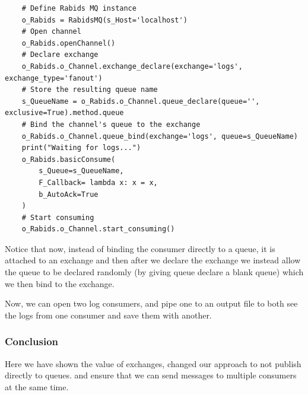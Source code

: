 \documentclass{article}
\begin{document}
\begin{verbatim}
    # Define Rabids MQ instance
    o_Rabids = RabidsMQ(s_Host='localhost')
    # Open channel 
    o_Rabids.openChannel()
    # Declare exchange
    o_Rabids.o_Channel.exchange_declare(exchange='logs', exchange_type='fanout')
    # Store the resulting queue name
    s_QueueName = o_Rabids.o_Channel.queue_declare(queue='', exclusive=True).method.queue
    # Bind the channel's queue to the exchange
    o_Rabids.o_Channel.queue_bind(exchange='logs', queue=s_QueueName)
    print("Waiting for logs...")
    o_Rabids.basicConsume(
        s_Queue=s_QueueName,
        F_Callback= lambda x: x = x,
        b_AutoAck=True
    )
    # Start consuming
    o_Rabids.o_Channel.start_consuming()
\end{verbatim}

Notice that now, instead of binding the consumer directly to a queue, it is attached to an exchange and then after we declare the exchange we instead allow the queue to be declared randomly (by giving queue declare a blank queue) which we then bind to the exchange.

Now, we can open two log consumers, and pipe one to an output file to both see the logs from one consumer and save them with another.

\subsubsection{Conclusion}

Here we have shown the value of exchanges, changed our approach to not publish directly to queues. and ensure that we can send messages to multiple consumers at the same time.
\end{document}
